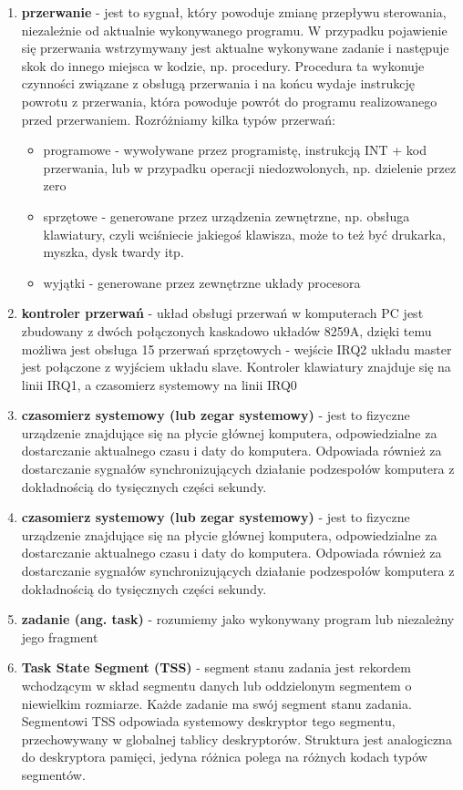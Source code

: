 \documentclass[a4paper,12pt]{article}
\begin{document}
\begin{enumerate}
	\item{\textbf{przerwanie} - jest to sygnał, który powoduje zmianę przepływu sterowania, niezależnie od aktualnie wykonywanego programu. W przypadku pojawienie się przerwania wstrzymywany jest aktualne wykonywane zadanie i następuje skok do innego miejsca w kodzie, np. procedury. Procedura ta wykonuje czynności związane z obsługą przerwania i na końcu wydaje instrukcję powrotu z przerwania, która powoduje powrót do programu realizowanego przed przerwaniem.
Rozróżniamy kilka typów przerwań:}
\begin{itemize}
\item{programowe - wywoływane przez programistę, instrukcją INT + kod przerwania, lub w przypadku operacji niedozwolonych, np. dzielenie przez zero}
\item{sprzętowe - generowane przez urządzenia zewnętrzne, np. obsługa klawiatury, czyli wciśniecie jakiegoś klawisza, może to też być drukarka, myszka, dysk twardy itp.}
\item{wyjątki - generowane przez zewnętrzne układy procesora}
\end{itemize}

\item{\textbf{kontroler przerwań} - układ obsługi przerwań w komputerach PC jest zbudowany z dwóch połączonych kaskadowo układów 8259A, dzięki temu możliwa jest obsługa 15 przerwań sprzętowych - wejście IRQ2 układu master jest połączone z wyjściem układu slave. Kontroler klawiatury znajduje się na linii IRQ1, a czasomierz systemowy na linii IRQ0}
				\item{\textbf{czasomierz systemowy (lub zegar systemowy)} - jest to fizyczne urządzenie znajdujące się na płycie głównej komputera, odpowiedzialne za dostarczanie aktualnego czasu i daty do komputera. Odpowiada również za dostarczanie sygnałów synchronizujących działanie podzespołów komputera z dokładnością do tysięcznych części sekundy.}

				\item{\textbf{czasomierz systemowy (lub zegar systemowy)} - jest to fizyczne urządzenie znajdujące się na płycie głównej komputera, odpowiedzialne za dostarczanie aktualnego czasu i daty do komputera. Odpowiada również za dostarczanie sygnałów synchronizujących działanie podzespołów komputera z dokładnością do tysięcznych części sekundy.}

\item{\textbf{zadanie (ang. task)} - rozumiemy jako wykonywany program lub niezależny jego fragment }

\item{\textbf{Task State Segment (TSS) } - segment stanu zadania jest rekordem wchodzącym w skład segmentu danych lub oddzielonym segmentem o niewielkim rozmiarze. Każde zadanie ma swój segment stanu zadania. Segmentowi TSS odpowiada systemowy deskryptor tego segmentu, przechowywany w globalnej tablicy deskryptorów. Struktura jest analogiczna do deskryptora pamięci, jedyna różnica polega na różnych kodach typów segmentów. }
			
\end{enumerate}
\end{document}
